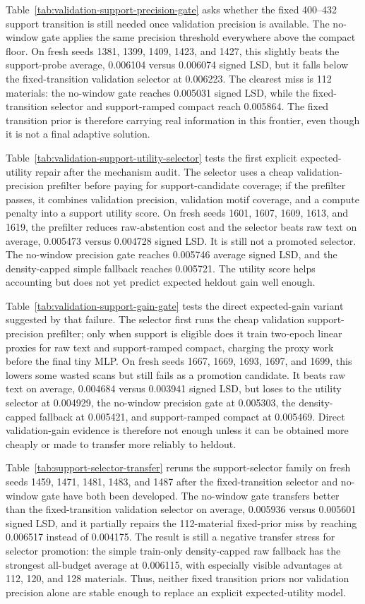 \documentclass[11pt]{article}
\begin{document}
Table~\ref{tab:validation-support-precision-gate} asks whether the fixed
400--432 support transition is still needed once validation precision is
available. The no-window gate applies the same precision threshold everywhere
above the compact floor. On fresh seeds 1381, 1399, 1409, 1423, and 1427, this
slightly beats the support-probe average, 0.006104 versus 0.006074 signed LSD,
but it falls below the fixed-transition validation selector at 0.006223. The
clearest miss is 112 materials: the no-window gate reaches 0.005031 signed LSD,
while the fixed-transition selector and support-ramped compact reach 0.005864.
The fixed transition prior is therefore carrying real information in this
frontier, even though it is not a final adaptive solution.

Table~\ref{tab:validation-support-utility-selector} tests the first explicit
expected-utility repair after the mechanism audit. The selector uses a cheap
validation-precision prefilter before paying for support-candidate coverage;
if the prefilter passes, it combines validation precision, validation motif
coverage, and a compute penalty into a support utility score. On fresh seeds
1601, 1607, 1609, 1613, and 1619, the prefilter reduces raw-abstention cost and
the selector beats raw text on average, 0.005473 versus 0.004728 signed LSD.
It is still not a promoted selector. The no-window precision gate reaches
0.005746 average signed LSD, and the density-capped simple fallback reaches
0.005721. The utility score helps accounting but does not yet predict expected
heldout gain well enough.

Table~\ref{tab:validation-support-gain-gate} tests the direct expected-gain
variant suggested by that failure. The selector first runs the cheap validation
support-precision prefilter; only when support is eligible does it train
two-epoch linear proxies for raw text and support-ramped compact, charging the
proxy work before the final tiny MLP. On fresh seeds 1667, 1669, 1693, 1697,
and 1699, this lowers some wasted scans but still fails as a promotion
candidate. It beats raw text on average, 0.004684 versus 0.003941 signed LSD,
but loses to the utility selector at 0.004929, the no-window precision gate at
0.005303, the density-capped fallback at 0.005421, and support-ramped compact
at 0.005469. Direct validation-gain evidence is therefore not enough unless it
can be obtained more cheaply or made to transfer more reliably to heldout.

Table~\ref{tab:support-selector-transfer} reruns the support-selector family on
fresh seeds 1459, 1471, 1481, 1483, and 1487 after the fixed-transition selector
and no-window gate have both been developed. The no-window gate transfers better
than the fixed-transition validation selector on average, 0.005936 versus
0.005601 signed LSD, and it partially repairs the 112-material fixed-prior miss
by reaching 0.006517 instead of 0.004175. The result is still a negative transfer
stress for selector promotion: the simple train-only density-capped raw fallback
has the strongest all-budget average at 0.006115, with especially visible
advantages at 112, 120, and 128 materials. Thus, neither fixed transition priors
nor validation precision alone are stable enough to replace an explicit
expected-utility model.
\end{document}
